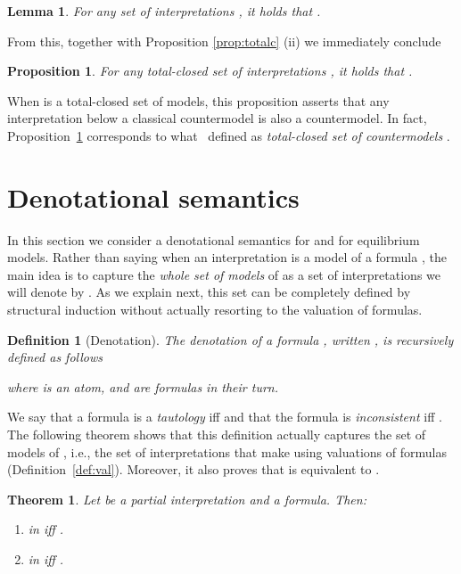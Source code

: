 \documentclass{tlp}
\def\qed{~\hfill}
\newtheorem{definition}{Definition}
\newtheorem{theorem}{Theorem}
\newtheorem{lemma}{Lemma}
\newtheorem{proposition}{Proposition}
\begin{document}
\begin{lemma}\label{lem:cm} 
For any set of interpretations , it holds that .\qed
\end{lemma}
From this, together with Proposition \ref{prop:totalc} (ii) we immediately conclude
\begin{proposition}\label{prop:cm} 
For any total-closed set of interpretations , it holds that .\qed
\end{proposition}
\noindent When  is a total-closed set of models, this proposition asserts that any interpretation below a classical countermodel is also a countermodel. In fact, Proposition~\ref{prop:cm} corresponds to what~\cite{CF07} defined as \emph{total-closed set of countermodels} .




\section{Denotational semantics}
\label{sec:zero}

In this section we consider a denotational semantics for  and for equilibrium models. Rather than saying when an interpretation  is a model of a formula , the main idea is to capture the \emph{whole set of models} of  as a set of interpretations we will denote by . As we explain next, this set can be completely defined by structural induction without actually resorting to the valuation of formulas.

\begin{definition}[Denotation]
The \emph{denotation} of a formula , written , is recursively defined as follows

\noindent where  is an atom, and  are formulas in their turn.\qed 
\end{definition}

We say that a formula  is a \emph{tautology} iff  and that the formula is \emph{inconsistent} iff . The following theorem shows that this definition actually captures the set of models of , i.e., the set of interpretations that make  using  valuations of formulas (Definition~\ref{def:val}). Moreover, it also proves that  is equivalent to .

\begin{theorem}\label{th:den-g3} 
Let  be a partial interpretation and  a formula. Then:
\begin{enumerate}
\item[\rm (i)]  in  iff .
\item[\rm (ii)]  in  iff .\qed
\end{enumerate}
\end{theorem}
\end{document}
